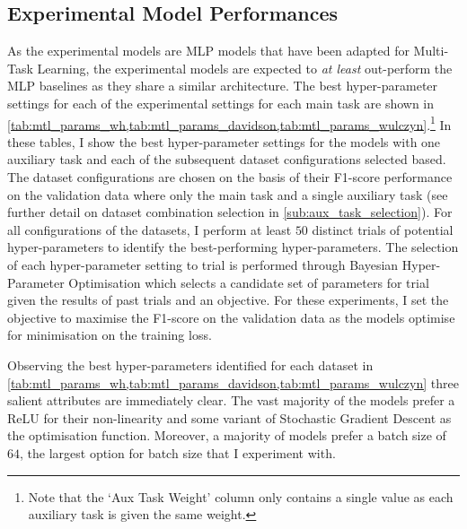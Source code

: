 \subsection{Experimental Model Performances}
As the experimental models are MLP models that have been adapted for Multi-Task Learning, the experimental models are expected to \textit{at least} out-perform the MLP baselines as they share a similar architecture.
The best hyper-parameter settings for each of the experimental settings for each main task are shown in \cref{tab:mtl_params_wh,tab:mtl_params_davidson,tab:mtl_params_wulczyn}.\footnote{Note that the `Aux Task Weight' column only contains a single value as each auxiliary task is given the same weight.}
In these tables, I show the best hyper-parameter settings for the models with one auxiliary task and each of the subsequent dataset configurations selected based.
The dataset configurations are chosen on the basis of their F1-score performance on the validation data where only the main task and a single auxiliary task (see further detail on dataset combination selection in \cref{sub:aux_task_selection}).
For all configurations of the datasets, I perform at least $50$ distinct trials of potential hyper-parameters to identify the best-performing hyper-parameters.
The selection of each hyper-parameter setting to trial is performed through Bayesian Hyper-Parameter Optimisation which selects a candidate set of parameters for trial given the results of past trials and an objective.
For these experiments, I set the objective to maximise the F1-score on the validation data as the models optimise for minimisation on the training loss.

Observing the best hyper-parameters identified for each dataset in \cref{tab:mtl_params_wh,tab:mtl_params_davidson,tab:mtl_params_wulczyn} three salient attributes are immediately clear.
The vast majority of the models prefer a ReLU for their non-linearity and some variant of Stochastic Gradient Descent as the optimisation function.
Moreover, a majority of models prefer a batch size of $64$, the largest option for batch size that I experiment with.

